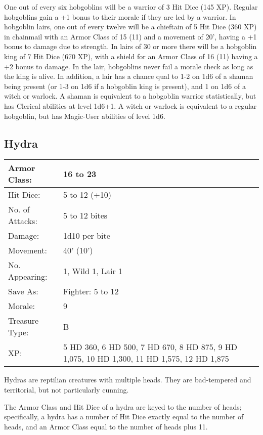 \documentclass[a4paper,twoside,openany,10pt]{book}
\begin{document}
\begin{multicols}{2}
One out of every six hobgoblins will be a warrior of 3 Hit Dice (145 XP). Regular hobgoblins gain a +1 bonus to their morale if they are led by a warrior. In hobgoblin lairs, one out of every twelve will be a chieftain of 5 Hit Dice (360 XP) in chainmail with an Armor Class of 15 (11) and a movement of 20', having a +1 bonus to damage due to strength. In lairs of 30 or more there will be a hobgoblin king of 7 Hit Dice (670 XP), with a shield for an Armor Class of 16 (11) having a +2 bonus to damage. In the lair, hobgoblins never fail a morale check as long as the king is alive. In addition, a lair has a chance qual to 1-2 on 1d6 of a shaman being present (or 1-3 on 1d6 if a hobgoblin king is present), and 1 on 1d6 of a witch or warlock. A shaman is equivalent to a hobgoblin warrior statistically, but has Clerical abilities at level 1d6+1. A witch or warlock is equivalent to a regular hobgoblin, but has Magic-User abilities of level 1d6.


\subsection*{Hydra}\label{hydra}
	
\begin{tabularx}{0.50\textwidth}{@{}lX@{}}
Armor Class: & 16 to 23 \\\hline
Hit Dice: & 5 to 12 (+10) \\\hline
No. of Attacks: & 5 to 12 bites \\\hline
Damage: & 1d10 per bite \\\hline
Movement: & 40' (10') \\\hline
No. Appearing: & 1, Wild 1, Lair 1 \\\hline
Save As: & Fighter: 5 to 12 \\\hline
Morale: & 9 \\\hline
Treasure Type: & B \\\hline
XP: & 5 HD 360, 6 HD 500, 7 HD 670, 8 HD 875, 9 HD 1,075, 10 HD 1,300,
11 HD 1,575, 12 HD 1,875 \\\hline
\end{tabularx}\medskip

Hydras are reptilian creatures with multiple heads. They are bad-tempered and territorial, but not particularly cunning. 

The Armor Class and Hit Dice of a hydra are keyed to the number of heads; specifically, a hydra has a number of Hit Dice exactly equal to the number of heads, and an Armor Class equal to the number of heads plus 11.


\end{multicols}
\end{document}
